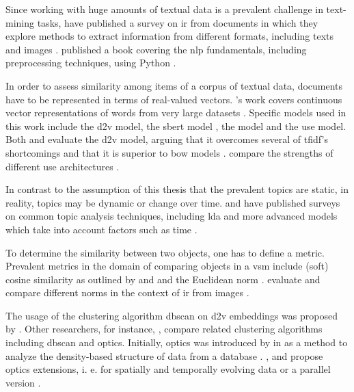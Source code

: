 Since working with huge amounts of textual data is a prevalent challenge in text-mining tasks,
\citeauthor{InformationRetrieval1999} have published a survey on \ac{ir} from documents in which
they explore methods to extract information from different formats, including texts and images \cite{InformationRetrieval1999}.
\citeauthor{nlp-book2009} published a book covering the \ac{nlp} fundamentals, including preprocessing techniques, using Python \cite{nlp-book2009}.

In order to assess similarity among items of a corpus of textual data, documents have to be represented in terms of real-valued vectors.
\citeauthor{WordRep2013}'s work covers continuous vector representations of words from very large datasets \cite{WordRep2013}.
Specific models used in this work include 
the \ac{d2v} model, the \ac{sbert} model \cite{HfsentTrans2019}, the \infersent{} model \cite{inferSent2018} and the \ac{use} model.
Both \citeauthor{clusteringDocs2020} and \citeauthor{SentRep2014} evaluate the \ac{d2v} model, 
arguing that it overcomes several of \ac{tfidf}'s shortcomings \cite{clusteringDocs2020} and that it is superior to \ac{bow} models \cite{SentRep2014}.
\citeauthor{UniversalSentEnc2018} compare the strengths of different \ac{use} architectures \cite{UniversalSentEnc2018}.

In contrast to the assumption of this thesis that the prevalent topics are static, in reality, topics may be dynamic or change over time.
\citeauthor{topic_modeling2015} and \citeauthor{topic_modeling2020} have published surveys on common topic analysis techniques, 
including \ac{lda} and more advanced models which take into account factors such as time \cite{topic_modeling2015, topic_modeling2020}.

To determine the similarity between two objects, one has to define a metric.
Prevalent metrics in the domain of comparing objects in a \ac{vsm} include (soft) cosine similarity 
as outlined by \citeauthor{soft_cosine2014} and \citeauthor{soft_cosine2017} \cite{soft_cosine2014, soft_cosine2017}
and the Euclidean norm \cite{euclidean_l2_norm2015}.
\citeauthor{euclidean_l2_norm2015} evaluate and compare different norms in the context of \ac{ir} from images \cite{euclidean_l2_norm2015}.


The usage of the clustering algorithm \ac{dbscan} on \ac{d2v} embeddings was proposed by \citeauthor{clusteringDocs2020} \cite{clusteringDocs2020}.
Other researchers, for instance, \citeauthor{OPTICS_kMeans_2016}, compare related clustering algorithms including \ac{dbscan} and \ac{optics}.
Initially, \ac{optics} was introduced by \citeauthor{OPTICS1999} in \citeyear{OPTICS1999} as a method to analyze the density-based structure of data from a database \cite{OPTICS1999}.
\citeauthor{OPTICS2013}, \citeauthor{OPTICS2014} and \citeauthor{OPTICS2016} propose \ac{optics} extensions, 
i. e. for spatially and temporally evolving data or a parallel version \cite{OPTICS2013, OPTICS2014, OPTICS2016}.



